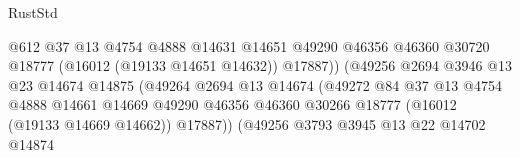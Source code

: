 \begin{lexlean}{RustStd}
\begin{coremodule}
                                                @612
                                                @37
                                                @13
                                                @4754
                                                @4888
                                                @14631
                                                @14651
                                                @49290
                                                @46356
                                                @46360
                                                @30720
                                                @18777
                                                (@16012 (@19133 @14651 @14632))
                                                @17887))
                                            (@49256
                                              @2694
                                              @3946
                                              @13
                                              @23
                                              @14674
                                              @14875
                                              (@49264
                                                @2694
                                                @13
                                                @14674
                                                (@49272
                                                  @84
                                                  @37
                                                  @13
                                                  @4754
                                                  @4888
                                                  @14661
                                                  @14669
                                                  @49290
                                                  @46356
                                                  @46360
                                                  @30266
                                                  @18777
                                                  (@16012 (@19133 @14669 @14662))
                                                  @17887))
                                              (@49256
                                                @3793
                                                @3945
                                                @13
                                                @22
                                                @14702
                                                @14874

\end{coremodule}
\end{lexlean}

